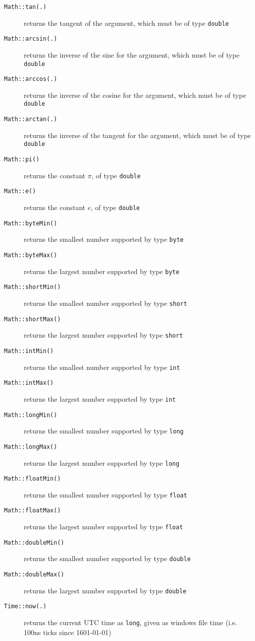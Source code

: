 \begin{description}
\item[\texttt{Math::tan(.)}] returns the tangent of the argument, which must be of type \texttt{double}
\item[\texttt{Math::arcsin(.)}] returns the inverse of the sine for the argument, which must be of type \texttt{double}
\item[\texttt{Math::arccos(.)}] returns the inverse of the cosine for the argument, which must be of type \texttt{double}
\item[\texttt{Math::arctan(.)}] returns the inverse of the tangent for the argument, which must be of type \texttt{double}
\item[\texttt{Math::pi()}] returns the constant $\pi$, of type \texttt{double}
\item[\texttt{Math::e()}] returns the constant $e$, of type \texttt{double}
\item[\texttt{Math::byteMin()}] returns the smallest number supported by type \texttt{byte}
\item[\texttt{Math::byteMax()}] returns the largest number supported by type \texttt{byte}
\item[\texttt{Math::shortMin()}] returns the smallest number supported by type \texttt{short}
\item[\texttt{Math::shortMax()}] returns the largest number supported by type \texttt{short}
\item[\texttt{Math::intMin()}] returns the smallest number supported by type \texttt{int}
\item[\texttt{Math::intMax()}] returns the largest number supported by type \texttt{int}
\item[\texttt{Math::longMin()}] returns the smallest number supported by type \texttt{long}
\item[\texttt{Math::longMax()}] returns the largest number supported by type \texttt{long}
\item[\texttt{Math::floatMin()}] returns the smallest number supported by type \texttt{float}
\item[\texttt{Math::floatMax()}] returns the largest number supported by type \texttt{float}
\item[\texttt{Math::doubleMin()}] returns the smallest number supported by type \texttt{double}
\item[\texttt{Math::doubleMax()}] returns the largest number supported by type \texttt{double}
\end{description}

\begin{description}
\item[\texttt{Time::now(.)}] returns the current UTC time as \texttt{long}, given as windows file time (i.e. 100ns ticks since 1601-01-01)
\end{description}

